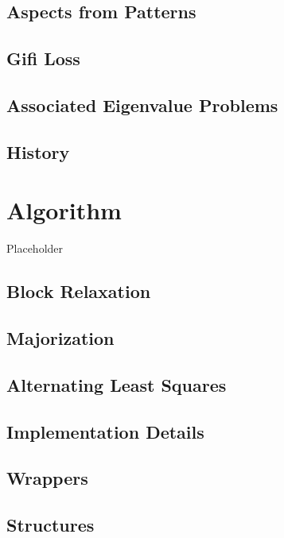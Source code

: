 \documentclass[
  12pt,
]{book}
\begin{document}
\section{Aspects from Patterns}\label{aspects-from-patterns}

\section{Gifi Loss}\label{gifi-loss}

\section{Associated Eigenvalue Problems}\label{associated-eigenvalue-problems}

\section{History}\label{history}

\chapter{Algorithm}\label{algorithm}

Placeholder

\section{Block Relaxation}\label{block-relaxation}

\section{Majorization}\label{majorization}

\section{Alternating Least Squares}\label{alternating-least-squares}

\section{Implementation Details}\label{implementation-details}

\section{Wrappers}\label{wrappers}

\section{Structures}\label{structures}
\end{document}
